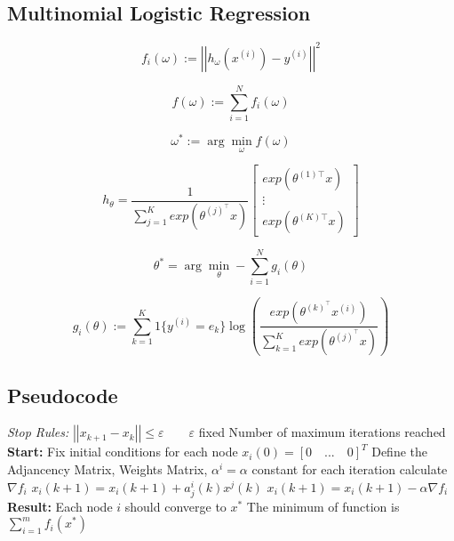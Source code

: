 \documentclass[a4paper,11pt,oneside]{book}
\begin{document}
\subsection {Multinomial Logistic Regression} \label{Subsec1.1.2}

\begin{equation}
f_i\left(\omega\right):=\left|\left|h_\omega\left(x^{(i)}\right)-y^{(i)}\right|\right|^2
\end{equation}

\begin{equation}
f\left(\omega\right):=\sum_{i=1}^{N}{f_i\left(\omega\right)}
\end{equation}

\begin{equation}
\omega^*:=\arg\min_\omega f\left(\omega\right)
\end{equation}

\begin{equation}
h_\theta=\frac{1}{\sum_{j=1}^{K}{exp\left(\theta^{(j)^\top}x\right)}}\begin{bmatrix}exp\left(\theta^{(1)\top}x\right)  \\ \vdots \\ exp\left(\theta^{(K)\top}x\right) \end{bmatrix}
\end{equation}

\begin{equation}
\theta^*=\arg\min_\theta -\sum_{i=1}^{N}{g_i(\theta)}
\end{equation}

\begin{equation}
g_i\left(\theta\right):=\sum_{k=1}^{K}{1\{y^{(i)}=e_k\}\log{\left( \frac{exp(\theta^{(k)^\top}x^{(i)})}{\sum_{k=1}^{K}{exp( \theta^{(j)^\top}x )}} \right)}}
\end{equation}

\subsection {Pseudocode} \label{Subsec1.1.3}
\begin{algorithm}
\caption{}
\begin{algorithmic} [1]
\State \textit{Stop Rules:}
\State $\left|\left|x_{k+1} - x_k\right|\right|  \leq \varepsilon \qquad \varepsilon$ fixed
\State Number of maximum iterations reached
\State \textbf{Start:}
\State Fix initial conditions for each node $x_i(0) = [0 \quad ... \quad 0]^T$
\State Define the Adjancency Matrix, Weights Matrix, $\alpha^i = \alpha$ constant for each iteration
	\State calculate $\nabla f_i$
		\State $x_i(k+1) = x_i(k+1) + a^i_j(k) x^j(k)$
	\EndFor
	\State $x_i(k+1) = x_i(k+1) - \alpha \nabla f_i$
\EndWhile
\State \textbf{Result:}
\State Each node $i$ should converge to $x^*$
\State The minimum of function is $\sum \limits_{i=1}^{m}f_i(x^*)$
\end{algorithmic}
\end{algorithm}
\end{document}
